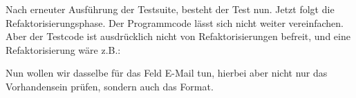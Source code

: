 \tddgreen
Nach erneuter Ausführung der Testsuite, besteht der Test nun. Jetzt folgt die Refaktorisierungsphase. Der Programmcode lässt sich nicht weiter vereinfachen. Aber der Testcode ist ausdrücklich nicht von Refaktorisierungen befreit, und eine Refaktorisierung wäre z.B.:
\tddrefactor
\begin{ruby}[label=test/unit/job\_test.rb]
  
       
   
\end{ruby}

Nun wollen wir dasselbe für das Feld E-Mail tun, hierbei aber nicht nur das Vorhandensein prüfen, sondern auch das Format.

